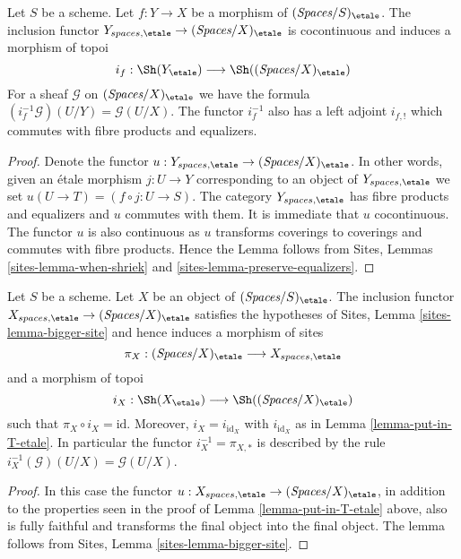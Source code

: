 \begin{lemma}
\label{lemma-put-in-T-etale}
Let $S$ be a scheme. Let $f : Y \to X$ be a morphism of
$(\textit{Spaces}/S)_\etale$. The inclusion functor
$Y_{spaces, \etale} \to (\textit{Spaces}/X)_\etale$
is cocontinuous and induces a morphism of topoi
$$
i_f :
\Sh(Y_\etale)
\longrightarrow
\Sh((\textit{Spaces}/X)_\etale)
$$
For a sheaf $\mathcal{G}$ on $(\textit{Spaces}/X)_\etale$
we have the formula $(i_f^{-1}\mathcal{G})(U/Y) = \mathcal{G}(U/X)$.
The functor $i_f^{-1}$ also has a left adjoint $i_{f, !}$ which commutes
with fibre products and equalizers.
\end{lemma}

\begin{proof}
Denote the functor $u : Y_{spaces, \etale} \to (\textit{Spaces}/X)_\etale$.
In other words, given an \'etale morphism $j : U \to Y$ corresponding
to an object of $Y_{spaces, \etale}$ we set
$u(U \to T) = (f \circ j : U \to S)$.
The category $Y_{spaces, \etale}$
has fibre products and equalizers and $u$ commutes with them.
It is immediate that $u$ cocontinuous.
The functor $u$ is also continuous as $u$ transforms coverings to coverings and
commutes with fibre products. Hence the Lemma follows from
Sites, Lemmas \ref{sites-lemma-when-shriek}
and \ref{sites-lemma-preserve-equalizers}.
\end{proof}

\begin{lemma}
\label{lemma-at-the-bottom-etale}
Let $S$ be a scheme. Let $X$ be an object of $(\textit{Spaces}/S)_\etale$.
The inclusion functor $X_{spaces, \etale} \to (\textit{Spaces}/X)_\etale$
satisfies the hypotheses of Sites, Lemma \ref{sites-lemma-bigger-site}
and hence induces a morphism of sites
$$
\pi_X :
(\textit{Spaces}/X)_\etale
\longrightarrow
X_{spaces, \etale}
$$
and a morphism of topoi
$$
i_X :
\Sh(X_\etale)
\longrightarrow
\Sh((\textit{Spaces}/X)_\etale)
$$
such that $\pi_X \circ i_X = \text{id}$. Moreover, $i_X = i_{\text{id}_X}$
with $i_{\text{id}_X}$ as in Lemma \ref{lemma-put-in-T-etale}.
In particular the functor $i_X^{-1} = \pi_{X, *}$ is described by the rule
$i_X^{-1}(\mathcal{G})(U/X) = \mathcal{G}(U/X)$.
\end{lemma}

\begin{proof}
In this case the functor
$u : X_{spaces, \etale} \to (\textit{Spaces}/X)_\etale$,
in addition to the properties seen in the proof of
Lemma \ref{lemma-put-in-T-etale} above, also is fully faithful
and transforms the final object into the final object.
The lemma follows from Sites, Lemma \ref{sites-lemma-bigger-site}.
\end{proof}

